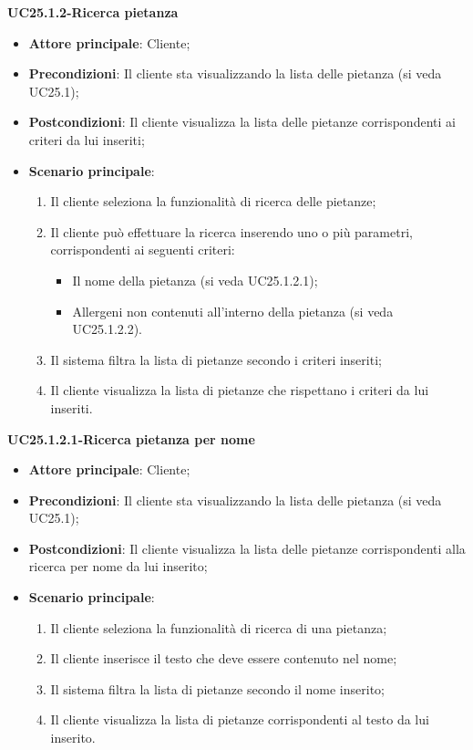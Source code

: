 \textbf{UC25.1.2-Ricerca pietanza}

\begin{itemize}
\item \textbf{Attore principale}: Cliente;
\item \textbf{Precondizioni}: Il cliente sta visualizzando la lista delle pietanza (si veda UC25.1);
\item \textbf{Postcondizioni}: Il cliente visualizza la lista delle pietanze corrispondenti ai criteri da lui inseriti;
\item \textbf{Scenario principale}:
\begin{enumerate}
\item Il cliente seleziona la funzionalità di ricerca delle pietanze;
\item Il cliente può effettuare la ricerca inserendo uno o più parametri, corrispondenti ai seguenti criteri:
\begin{itemize}
\item Il nome della pietanza (si veda UC25.1.2.1);
\item Allergeni non contenuti all'interno della pietanza (si veda UC25.1.2.2).
\end{itemize}
\item Il sistema filtra la lista di pietanze secondo i criteri inseriti;
\item Il cliente visualizza la lista di pietanze che rispettano i criteri da lui inseriti.
\end{enumerate}
\end{itemize}

\textbf{UC25.1.2.1-Ricerca pietanza per nome}

\begin{itemize}
\item \textbf{Attore principale}: Cliente;
\item \textbf{Precondizioni}: Il cliente sta visualizzando la lista delle pietanza (si veda UC25.1);
\item \textbf{Postcondizioni}: Il cliente visualizza la lista delle pietanze corrispondenti alla ricerca per nome da lui inserito;
\item \textbf{Scenario principale}:
\begin{enumerate}
\item Il cliente seleziona la funzionalità di ricerca di una pietanza;
\item Il cliente inserisce il testo che deve essere contenuto nel nome;
\item Il sistema filtra la lista di pietanze secondo il nome inserito;
\item Il cliente visualizza la lista di pietanze corrispondenti al testo da lui inserito.
\end{enumerate}
\end{itemize}

